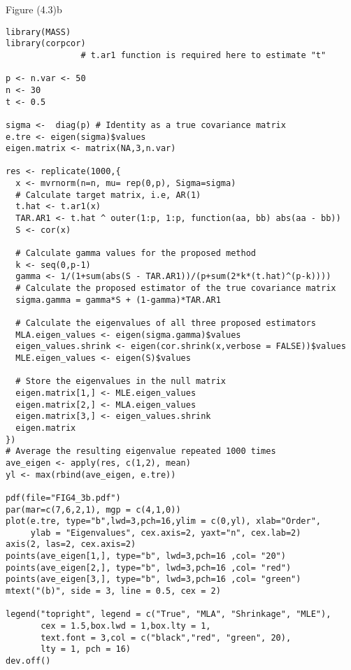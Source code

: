 Figure (4.3)b
\begin{lstlisting}
library(MASS)
library(corpcor)
               # t.ar1 function is required here to estimate "t"              
              
p <- n.var <- 50
n <- 30
t <- 0.5

sigma <-  diag(p) # Identity as a true covariance matrix
e.tre <- eigen(sigma)$values
eigen.matrix <- matrix(NA,3,n.var)

res <- replicate(1000,{
  x <- mvrnorm(n=n, mu= rep(0,p), Sigma=sigma)
  # Calculate target matrix, i.e, AR(1)
  t.hat <- t.ar1(x)
  TAR.AR1 <- t.hat ^ outer(1:p, 1:p, function(aa, bb) abs(aa - bb))
  S <- cor(x)
  
  # Calculate gamma values for the proposed method
  k <- seq(0,p-1)
  gamma <- 1/(1+sum(abs(S - TAR.AR1))/(p+sum(2*k*(t.hat)^(p-k))))
  # Calculate the proposed estimator of the true covariance matrix
  sigma.gamma = gamma*S + (1-gamma)*TAR.AR1
  
  # Calculate the eigenvalues of all three proposed estimators
  MLA.eigen_values <- eigen(sigma.gamma)$values
  eigen_values.shrink <- eigen(cor.shrink(x,verbose = FALSE))$values
  MLE.eigen_values <- eigen(S)$values
  
  # Store the eigenvalues in the null matrix
  eigen.matrix[1,] <- MLE.eigen_values
  eigen.matrix[2,] <- MLA.eigen_values
  eigen.matrix[3,] <- eigen_values.shrink
  eigen.matrix
})
# Average the resulting eigenvalue repeated 1000 times
ave_eigen <- apply(res, c(1,2), mean)
yl <- max(rbind(ave_eigen, e.tre))

pdf(file="FIG4_3b.pdf")
par(mar=c(7,6,2,1), mgp = c(4,1,0))
plot(e.tre, type="b",lwd=3,pch=16,ylim = c(0,yl), xlab="Order",
     ylab = "Eigenvalues", cex.axis=2, yaxt="n", cex.lab=2)
axis(2, las=2, cex.axis=2)
points(ave_eigen[1,], type="b", lwd=3,pch=16 ,col= "20")
points(ave_eigen[2,], type="b", lwd=3,pch=16 ,col= "red")
points(ave_eigen[3,], type="b", lwd=3,pch=16 ,col= "green")
mtext("(b)", side = 3, line = 0.5, cex = 2)

legend("topright", legend = c("True", "MLA", "Shrinkage", "MLE"),
       cex = 1.5,box.lwd = 1,box.lty = 1,
       text.font = 3,col = c("black","red", "green", 20),
       lty = 1, pch = 16)
dev.off()
\end{lstlisting}

